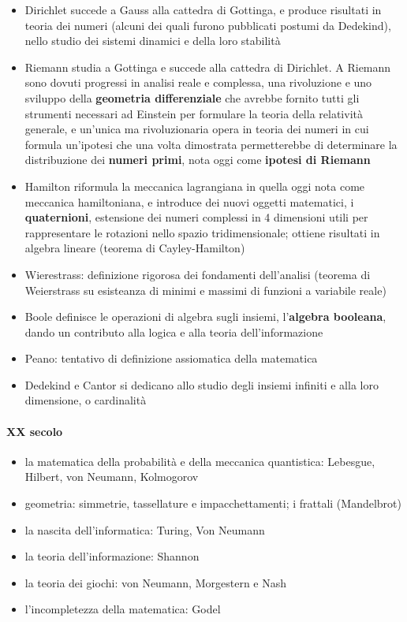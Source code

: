 \begin{itemize}
  \item Dirichlet succede a Gauss alla cattedra di Gottinga, e produce risultati in teoria dei numeri (alcuni dei quali furono pubblicati postumi da Dedekind), nello studio dei sistemi dinamici e della loro stabilità
  \item Riemann studia a Gottinga e succede alla cattedra di Dirichlet. A Riemann sono dovuti progressi in analisi reale e complessa, una rivoluzione e uno sviluppo della \textbf{geometria differenziale} che avrebbe fornito tutti gli strumenti necessari ad Einstein per formulare la teoria della relatività generale, e un'unica ma rivoluzionaria opera in teoria dei numeri in cui formula un'ipotesi che una volta dimostrata permetterebbe di determinare la distribuzione dei \textbf{numeri primi}, nota oggi come \textbf{ipotesi di Riemann}
  \item Hamilton riformula la meccanica lagrangiana in quella oggi nota come meccanica hamiltoniana, e introduce dei nuovi oggetti matematici, i \textbf{quaternioni}, estensione dei numeri complessi in 4 dimensioni utili per rappresentare le rotazioni nello spazio tridimensionale; ottiene risultati in algebra lineare (teorema di Cayley-Hamilton)
  \item Wierestrass: definizione rigorosa dei fondamenti dell'analisi (teorema di Weierstrass su esisteanza di minimi e massimi di funzioni a variabile reale)
  \item Boole definisce le operazioni di algebra sugli insiemi, l'\textbf{algebra booleana}, dando un contributo alla logica e alla teoria dell'informazione
  \item Peano: tentativo di definizione assiomatica della matematica
  \item Dedekind e Cantor si dedicano allo studio degli insiemi infiniti e alla loro dimensione, o cardinalità
\end{itemize}
\paragraph{XX secolo}
\begin{itemize}
  \item la matematica della probabilità e della meccanica quantistica: Lebesgue, Hilbert, von Neumann, Kolmogorov
  \item geometria: simmetrie, tassellature e impacchettamenti; i frattali (Mandelbrot)
  \item la nascita dell'informatica: Turing, Von Neumann
  \item la teoria dell'informazione: Shannon
  \item la teoria dei giochi: von Neumann, Morgestern e Nash
  \item l'incompletezza della matematica: Godel
\end{itemize}

